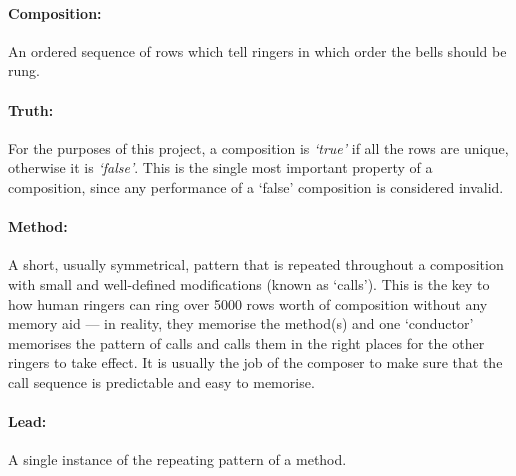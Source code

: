 \documentclass[12pt]{article}
\begin{document}
\paragraph{Composition:} An ordered sequence of rows which tell ringers in which order the bells
should be rung.

\paragraph{Truth:} For the purposes of this project, a composition is \emph{`true'} if all the rows
are unique, otherwise it is \emph{`false'}.  This is the single most important property of a
composition, since any performance of a `false' composition is considered invalid.

\paragraph{Method:} A short, usually symmetrical, pattern that is repeated throughout a composition
with small and well-defined modifications (known as `calls').  This is the key to how human ringers
can ring over 5000 rows worth of composition without any memory aid --- in reality, they memorise
the method(s) and one `conductor' memorises the pattern of calls and calls them in the right places
for the other ringers to take effect.  It is usually the job of the composer to make sure that the
call sequence is predictable and easy to memorise.

\paragraph{Lead:} A single instance of the repeating pattern of a method.
\end{document}
